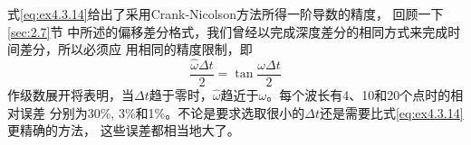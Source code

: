 式\ref{eq:ex4.3.14}给出了采用Crank-Nicolson方法所得一阶导数的精度，
回顾一下\ref{sec:2.7}节
中所述的偏移差分格式，我们曾经以完成深度差分的相同方式来完成时间差分，所以必须应
用相同的精度限制，即
\begin{equation}
\frac{\hat{\omega}\Delta t}{2}=\tan\frac{\omega \Delta t}{2}
\label{eq:ex4.3.15}
\end{equation}
作级数展开将表明，当$\Delta t$趋于零时，$\hat{\omega}$趋近于$\omega$。每个波长有4、10和20个点时的相对误差
分别为30\%, 3\%和1\%。不论是要求选取很小的$\Delta t$还是需要比式\ref{eq:ex4.3.14}更精确的方法， 这些误差都相当地大了。


